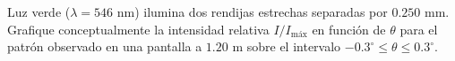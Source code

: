 \item Luz verde ($\lambda = 546\text{ nm}$) ilumina dos rendijas estrechas separadas por $0.250\text{ mm}$. Grafique conceptualmente la intensidad relativa $I/I_{\text{máx}}$ en función de $\theta$ para el patrón observado en una pantalla a $1.20\text{ m}$ sobre el intervalo $-0.3^\circ \le \theta \le 0.3^\circ$.